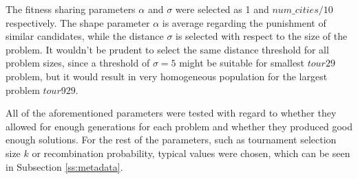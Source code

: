 \documentclass[a4paper,10pt]{article}
\newcommand{\ReplaceMe}[1]{{\color{blue}#1}}
\begin{document}
The fitness sharing parameters $\alpha$ and $\sigma$ were selected as 1 and $num\_cities / 10$ respectively. The shape parameter $\alpha$ is average regarding the punishment of similar candidates, while the distance $\sigma$ is selected with respect to the size of the problem. It wouldn't be prudent to select the same distance threshold for all problem sizes, since a threshold of $\sigma=5$ might be suitable for smallest $tour29$ problem, but it would result in very homogeneous population for the largest problem $tour929$.

All of the aforementioned parameters were tested with regard to whether they allowed for enough generations for each problem and whether they produced good enough solutions. For the rest of the parameters, such as tournament selection size $k$ or recombination probability, typical values were chosen, which can be seen in Subsection \ref{ss:metadata}.





\end{document}
